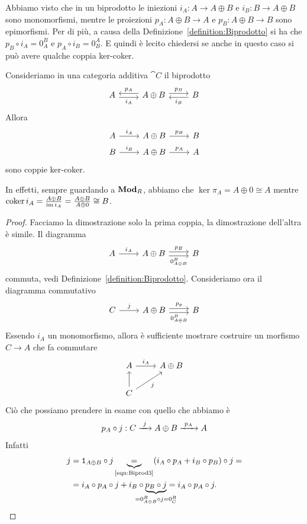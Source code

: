 Abbiamo visto che in un biprodotto le iniezioni
\(i_A : A \to A \oplus B\) e \(i_B : B \to A \oplus B\) sono
monomorfismi, mentre le proiezioni \(p_A : A \oplus B \to A\) e
\(p_B : A \oplus B \to B\) sono epimorfismi. Per di più, a causa della
Definizione~\ref{definition:Biprodotto} si ha che
\(p_B \circ i_A = 0_A^B\) e \(p_A \circ i_B = 0_B^A\). E quindi è lecito
chiedersi se anche in questo caso si può avere qualche coppia ker-coker.

\begin{lemma}\label{lemma:KerCokerInjProj}
  Consideriamo in una categoria additiva \(\cat C\) il biprodotto
  \[
    \begin{tikzcd}
      A \ar["{i_A}", r, shift right, swap] & A \oplus B \ar["{p_A}", l,
      shift right, swap] \ar["{p_B}", r, shift left] & B \ar["{i_B}", l,
      shift left]
    \end{tikzcd}
  \]
  Allora
  \[
    \begin{tikzcd}[row sep=tiny]
      A \ar["{i_A}", r] & A \oplus B \ar["{p_B}", r] & B \\
      B \ar["{i_B}", r] & A \oplus B \ar["{p_A}", r] & A
    \end{tikzcd}
  \]
  sono coppie ker-coker.
\end{lemma}

In effetti, sempre guardando a \(\mathbf{Mod}_R\), abbiamo che
\(\ker \pi_A = A \oplus 0 \cong A\) mentre
\(\operatorname{coker} i_A = \frac{A \oplus B}{\operatorname{im} i_A} = \frac{A \oplus B}{A \oplus
  0} \cong B\).

\begin{proof}
  Facciamo la dimostrazione solo la prima coppia, la dimostrazione
  dell'altra è simile. Il diagramma
  \[
    \begin{tikzcd}
      A \ar["{i_A}", r] & A \oplus B \ar["{p_B}", r, shift left]
      \ar["{0_{A \oplus B}^B}", r, shift right, swap] & B
    \end{tikzcd}
  \]
  commuta, vedi Definizione~\ref{definition:Biprodotto}. Consideriamo
  ora il diagramma commutativo
  \[
    \begin{tikzcd}
      C \ar["{j}", r] & A \oplus B \ar["{p_p}", r, shift left]
      \ar["{0_{A \oplus B}^B}", r, shift right, swap] & B
    \end{tikzcd}
  \]
  Essendo \(i_A\) un monomorfismo, allora è sufficiente mostrare
  costruire un morfismo \(C \to A\) che fa commutare
  \[
    \begin{tikzcd}
      A \ar["{i_A}",r] & A \oplus B \\
      C \ar[u] \ar["{j}", ur, swap]
    \end{tikzcd}
  \]
  Ciò che possiamo prendere in esame con quello che abbiamo è
  \[
    p_A \circ j : C \xrightarrow{\ j\ } A \oplus B \xrightarrow{\ p_A\ } A
  \]
  Infatti
  \begin{align*}
    j &= \id_{A \oplus B} \circ j \underbrace{=}_{\text{\eqref{eqn:Biprod3}}}
        (i_A \circ p_A + i_B \circ p_B) \circ j = \\
      &= i_A \circ p_A \circ j + i_B \circ \underbrace{p_B \circ j}_{\mathclap{\cramped{= 0_{A \oplus B}^B
        \circ j = 0_C^B}}} = i_A \circ p_A \circ j . \qedhere
  \end{align*}
\end{proof}

